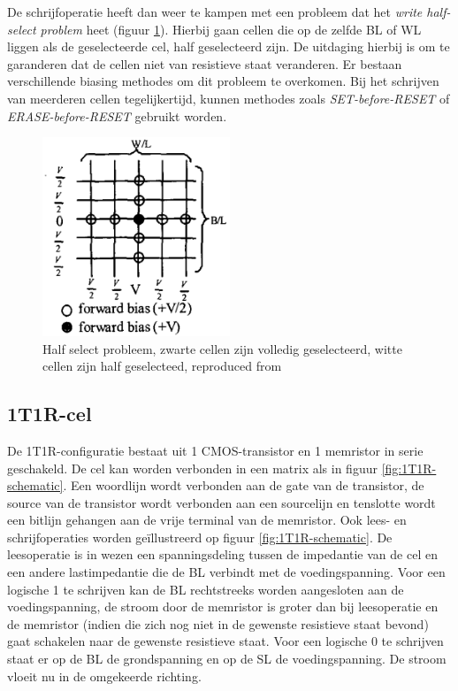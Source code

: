 De schrijfoperatie heeft dan weer te kampen met een probleem dat het \textit{write half-select problem} heet (figuur \ref{fig:halfselct}). Hierbij gaan cellen die op de zelfde BL of WL liggen als de geselecteerde cel, half geselecteerd zijn. De uitdaging hierbij is om te garanderen dat de cellen niet van resistieve staat veranderen. Er bestaan verschillende biasing methodes \cite{1269425} om dit probleem te overkomen. Bij het schrijven van meerderen cellen tegelijkertijd, kunnen methodes zoals \textit{SET-before-RESET} of \textit{ERASE-before-RESET}\cite{5763125} gebruikt worden.

\begin{figure}
  \centering
  \includegraphics[width=0.5\textwidth]{../fig/hfdstk-cel-halfselect.png}
  \caption[Half select problem]{Half select probleem, zwarte cellen zijn volledig geselecteerd, witte cellen zijn half geselecteed, reproduced from\cite{1269425}}
  \label{fig:halfselct}
\end{figure}

\subsection{1T1R-cel}
\label{1T1R}
De 1T1R-configuratie bestaat uit 1 CMOS-transistor en 1 memristor in serie geschakeld. De cel kan  worden verbonden in een matrix als in figuur \ref{fig:1T1R-schematic}. Een woordlijn wordt verbonden aan de gate van de transistor, de source van de transistor wordt verbonden aan een sourcelijn en tenslotte wordt een bitlijn gehangen aan de vrije terminal van de memristor. Ook lees- en schrijfoperaties worden geïllustreerd op figuur \ref{fig:1T1R-schematic}. De leesoperatie is in wezen een spanningsdeling tussen de impedantie van de cel en een andere lastimpedantie die de BL verbindt met de voedingspanning. Voor een logische 1 te schrijven kan de BL rechtstreeks worden aangesloten aan de voedingspanning, de stroom door de memristor is groter dan bij leesoperatie en de memristor (indien die zich nog niet in de gewenste resistieve staat bevond) gaat schakelen naar de gewenste resistieve staat. Voor een logische 0 te schrijven staat er op de BL de grondspanning en op de SL de voedingspanning. De stroom vloeit nu in de omgekeerde richting.

